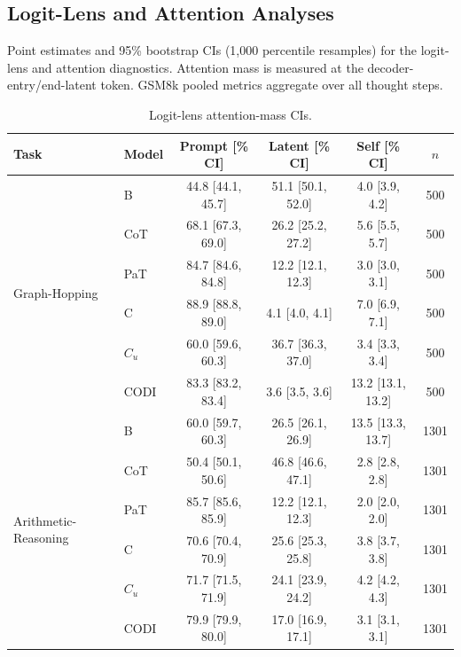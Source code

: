 \subsection{Logit-Lens and Attention Analyses}
\label{app:logit_lens_stats}

Point estimates and 95\% bootstrap CIs (1{,}000 percentile resamples) for the logit-lens and attention diagnostics. Attention mass is measured at the decoder-entry/end-latent token. GSM8k pooled metrics aggregate over all thought steps.

\begin{table}[h!]
\centering
\small
\setlength{\tabcolsep}{4pt}
\caption{Logit-lens attention-mass CIs.}
\begin{tabular}{llcccc}
\toprule
Task & Model & Prompt [\% CI] & Latent [\% CI] & Self [\% CI] & $n$ \\
\midrule
\multirow{6}{*}{Graph-Hopping} & B & 44.8 [44.1, 45.7] & 51.1 [50.1, 52.0] & 4.0 [3.9, 4.2] & 500 \\
 & CoT & 68.1 [67.3, 69.0] & 26.2 [25.2, 27.2] & 5.6 [5.5, 5.7] & 500 \\
 & PaT & 84.7 [84.6, 84.8] & 12.2 [12.1, 12.3] & 3.0 [3.0, 3.1] & 500 \\
 & C & 88.9 [88.8, 89.0] & 4.1 [4.0, 4.1] & 7.0 [6.9, 7.1] & 500 \\
 & $C_u$ & 60.0 [59.6, 60.3] & 36.7 [36.3, 37.0] & 3.4 [3.3, 3.4] & 500 \\
 & CODI & 83.3 [83.2, 83.4] & 3.6 [3.5, 3.6] & 13.2 [13.1, 13.2] & 500 \\
\midrule
\multirow{6}{*}{Arithmetic-Reasoning} & B & 60.0 [59.7, 60.3] & 26.5 [26.1, 26.9] & 13.5 [13.3, 13.7] & 1301 \\
 & CoT & 50.4 [50.1, 50.6] & 46.8 [46.6, 47.1] & 2.8 [2.8, 2.8] & 1301 \\
 & PaT & 85.7 [85.6, 85.9] & 12.2 [12.1, 12.3] & 2.0 [2.0, 2.0] & 1301 \\
 & C & 70.6 [70.4, 70.9] & 25.6 [25.3, 25.8] & 3.8 [3.7, 3.8] & 1301 \\
 & $C_u$ & 71.7 [71.5, 71.9] & 24.1 [23.9, 24.2] & 4.2 [4.2, 4.3] & 1301 \\
 & CODI & 79.9 [79.9, 80.0] & 17.0 [16.9, 17.1] & 3.1 [3.1, 3.1] & 1301 \\
\bottomrule
\end{tabular}
\label{tab:logit_lens_attention_stats}
\end{table}

